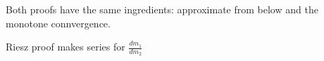 \begin{remark}
	Both proofs have the same ingredients: approximate from below and the monotone connvergence.

	Riesz proof makes series for $\frac{d m_1}{d m_2}$
\end{remark}

